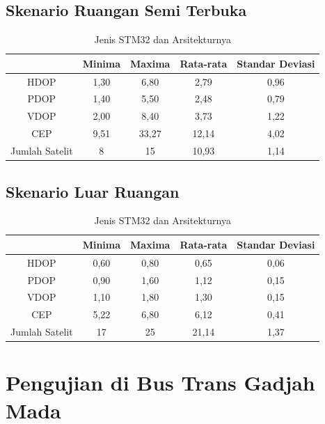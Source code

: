 \subsection{Skenario Ruangan Semi Terbuka}
\begin{table}[H]
	\caption{Jenis STM32 dan Arsitekturnya}
	\vspace{0.5em}
	\centering
	\begin{tabular}{ccccc}
		\hline
		& \textbf{Minima} & \textbf{Maxima} & \textbf{Rata-rata} & \textbf{Standar Deviasi}\\
		\hline 
		HDOP & 1,30	& 6,80 & 2,79 & 0,96\\
		PDOP & 1,40	& 5,50 & 2,48 & 0,79\\
		VDOP & 2,00	& 8,40 & 3,73 & 1,22\\
		CEP & 9,51	& 33,27 & 12,14 & 4,02\\
		Jumlah Satelit & 8 & 15 & 10,93 & 1,14\\
		\hline
	\end{tabular}
	\label{Tab: semioutdoor-table}
\end{table}

\subsection{Skenario Luar Ruangan}
\begin{table}[H]
	\caption{Jenis STM32 dan Arsitekturnya}
	\vspace{0.5em}
	\centering
	\begin{tabular}{ccccc}
		\hline
		& \textbf{Minima} & \textbf{Maxima} & \textbf{Rata-rata} & \textbf{Standar Deviasi}\\
		\hline 
		HDOP & 0,60 & 0,80 & 0,65 & 0,06 \\
		PDOP & 0,90 & 1,60 & 1,12 & 0,15 \\
		VDOP & 1,10	& 1,80 & 1,30 & 0,15 \\
		CEP & 5,22 & 6,80 & 6,12 & 0,41 \\
		Jumlah Satelit & 17	& 25 & 21,14 & 1,37 \\
		\hline
	\end{tabular}
	\label{Tab: outdoor-table}
\end{table}

\section{Pengujian di Bus Trans Gadjah Mada}